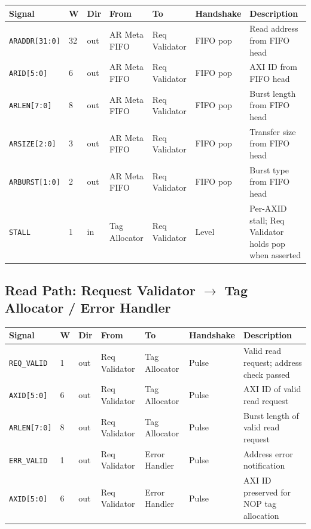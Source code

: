 \documentclass[11pt,a4paper]{article}
\begin{document}
\begin{tabularx}{\textwidth}{L{3.0cm} C{0.8cm} C{1.0cm} L{2.2cm} L{2.2cm} L{2.0cm} X}
\toprule
\textbf{Signal} & \textbf{W} & \textbf{Dir} & \textbf{From} & \textbf{To} & \textbf{Handshake} & \textbf{Description} \\
\midrule
\texttt{ARADDR[31:0]}  & 32 & out & AR Meta FIFO & Req Validator & FIFO pop & Read address from FIFO head \\
\texttt{ARID[5:0]}     & 6  & out & AR Meta FIFO & Req Validator & FIFO pop & AXI ID from FIFO head \\
\texttt{ARLEN[7:0]}    & 8  & out & AR Meta FIFO & Req Validator & FIFO pop & Burst length from FIFO head \\
\texttt{ARSIZE[2:0]}   & 3  & out & AR Meta FIFO & Req Validator & FIFO pop & Transfer size from FIFO head \\
\texttt{ARBURST[1:0]}  & 2  & out & AR Meta FIFO & Req Validator & FIFO pop & Burst type from FIFO head \\
\texttt{STALL}         & 1  & in  & Tag Allocator & Req Validator & Level & Per-AXID stall; Req Validator holds pop when asserted \\
\bottomrule
\end{tabularx}

\subsection{Read Path: Request Validator $\rightarrow$ Tag Allocator / Error Handler}

\begin{tabularx}{\textwidth}{L{3.0cm} C{0.8cm} C{1.0cm} L{2.2cm} L{2.2cm} L{2.0cm} X}
\toprule
\textbf{Signal} & \textbf{W} & \textbf{Dir} & \textbf{From} & \textbf{To} & \textbf{Handshake} & \textbf{Description} \\
\midrule
\texttt{REQ\_VALID}    & 1 & out & Req Validator & Tag Allocator & Pulse & Valid read request; address check passed \\
\texttt{AXID[5:0]}     & 6 & out & Req Validator & Tag Allocator & Pulse & AXI ID of valid read request \\
\texttt{ARLEN[7:0]}    & 8 & out & Req Validator & Tag Allocator & Pulse & Burst length of valid read request \\
\midrule
\texttt{ERR\_VALID}    & 1 & out & Req Validator & Error Handler  & Pulse & Address error notification \\
\texttt{AXID[5:0]}     & 6 & out & Req Validator & Error Handler  & Pulse & AXI ID preserved for NOP tag allocation \\
\bottomrule
\end{tabularx}
\end{document}
